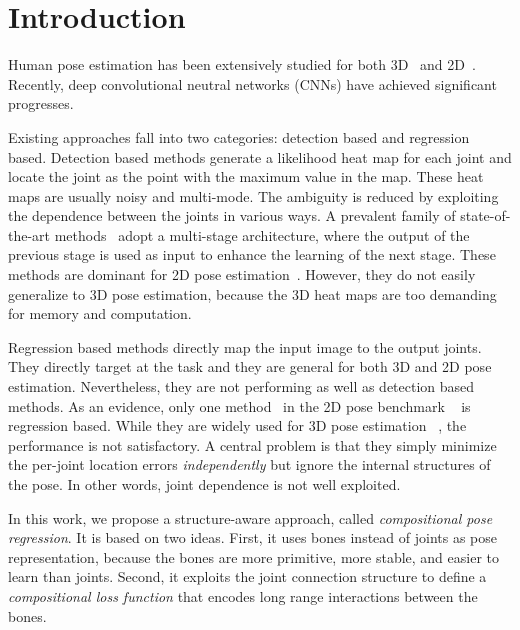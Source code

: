 \documentclass[10pt,twocolumn,letterpaper]{article}
\begin{document}
\section{Introduction}
\label{sec.introduction}

Human pose estimation has been extensively studied for both 3D~\cite{ionescu2014human3} and 2D~\cite{andriluka20142d}. Recently, deep convolutional neutral networks (CNNs) have achieved significant progresses. 

Existing approaches fall into two categories: detection based and regression based. Detection based methods generate a likelihood heat map for each joint and locate the joint as the point with the maximum value in the map. These heat maps are usually noisy and multi-mode. The ambiguity is reduced by exploiting the dependence between the joints in various ways. A prevalent family of state-of-the-art methods~\cite{chu2017multi, carreira2016human, newell2016stacked, bulat2016human, wei2016convolutional, insafutdinov2016deepercut} adopt a multi-stage architecture, where the output of the previous stage is used as input to enhance the learning of the next stage. These methods are dominant for 2D pose estimation~\cite{mpiiwebpage}. However, they do not easily generalize to 3D pose estimation, because the 3D heat maps are too demanding for memory and computation.

Regression based methods directly map the input image to the output joints. They  directly target at the task and they are general for both 3D and 2D pose estimation. Nevertheless, they are not performing as well as detection based methods. As an evidence, only one method~\cite{carreira2016human} in the 2D pose benchmark ~\cite{mpiiwebpage} is regression based. While they are widely used for 3D pose estimation ~\cite{zhou2016deep,moreno20163d,mehta2016monocular,tekin2016direct,li2015maximum,tekin2016structured,park20163d}, the performance is not satisfactory. A central problem is that they simply minimize the per-joint location errors \emph{independently} but ignore the internal structures of the pose. In other words, joint dependence is not well exploited.

In this work, we propose a structure-aware approach, called \emph{compositional pose regression}. It is based on two ideas. First, it uses bones instead of joints as pose representation, because the bones are more primitive, more stable, and easier to learn than joints. Second, it exploits the joint connection structure to define a \emph{compositional loss function} that encodes long range interactions between the bones.
\end{document}
